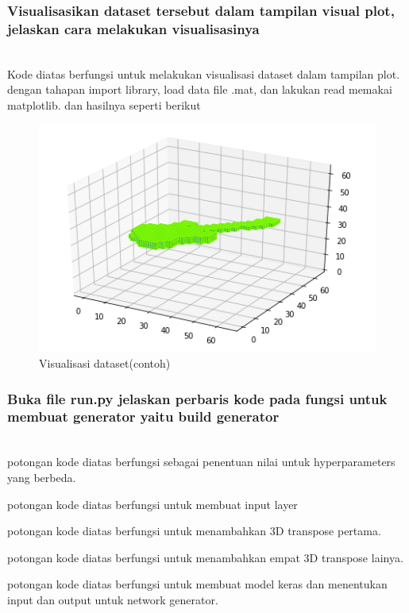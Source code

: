 \subsubsection{Visualisasikan dataset tersebut dalam tampilan visual plot, jelaskan cara melakukan visualisasinya}
\hfill\\

Kode diatas berfungsi untuk melakukan visualisasi dataset dalam tampilan plot. dengan tahapan import library, load data file .mat, dan lakukan read memakai matplotlib. dan hasilnya seperti berikut
\begin{figure}[H]
	\centering
	\includegraphics[scale=0.5]{figures/1174087/8/guitar.png}
	\caption{Visualisasi dataset(contoh)}
\end{figure}

\subsubsection{Buka file run.py jelaskan perbaris kode pada fungsi untuk membuat generator yaitu build generator}
\hfill\\

potongan kode diatas berfungsi sebagai penentuan nilai untuk hyperparameters yang berbeda.

potongan kode diatas berfungsi untuk membuat input layer

potongan kode diatas berfungsi untuk menambahkan 3D transpose pertama.

potongan kode diatas berfungsi untuk menambahkan empat 3D transpose lainya.

potongan kode diatas berfungsi untuk membuat model keras dan menentukan input dan output untuk network generator.

